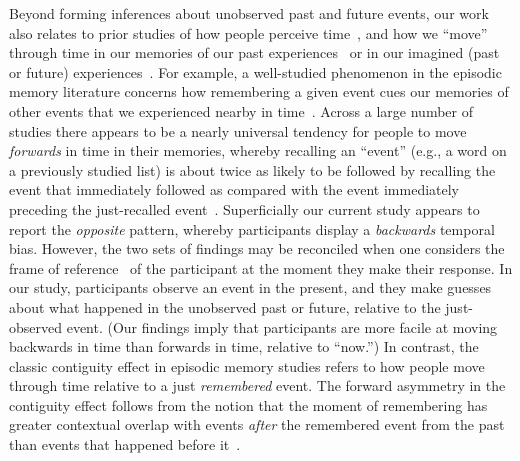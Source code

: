 \documentclass[10pt]{article}
\begin{document}
Beyond forming inferences about unobserved past and future events, our work
also relates to prior studies of how people perceive time~\citep{BlocGrub14,
Howa18, Eagl08, IvrySchl08, Wear16}, and how we ``move'' through time in our
memories of our past experiences~\citep{Mann21a, MannEtal11, HowaEtal12,
MannEtal07, ShanHowa12, Kaha96, PolyKaha08, SchaTulv94} or in our imagined
(past or future) experiences~\citep{Scha12, JossTone20, SchaEtal98,
MomeHowa18}. For example, a well-studied phenomenon in the episodic memory
literature concerns how remembering a given event cues our memories of other
events that we experienced nearby in time~\citep[i.e., the \textit{contiguity
effect};][]{Kaha96}. Across a large number of studies there appears to be a
nearly universal tendency for people to move \textit{forwards} in time in their
memories, whereby recalling an ``event'' (e.g., a word on a previously studied
list) is about twice as likely to be followed by recalling the event that
immediately followed as compared with the event immediately preceding the
just-recalled event~\citep{HealKaha14a}. Superficially our current study
appears to report the \textit{opposite} pattern, whereby participants display a
\textit{backwards} temporal bias. However, the two sets of findings may be
reconciled when one considers the frame of reference~\citep[and current mental
context; e.g.,][]{HowaKaha02a} of the participant at the moment they make their
response. In our study, participants observe an event in the present, and they
make guesses about what happened in the unobserved past or future, relative to
the just-observed event. (Our findings imply that participants are more facile
at moving backwards in time than forwards in time, relative to ``now.'') In
contrast, the classic contiguity effect in episodic memory studies refers to
how people move through time relative to a just \textit{remembered} event. The
forward asymmetry in the contiguity effect follows from the notion that the
moment of remembering has greater contextual overlap with events \textit{after}
the remembered event from the past than events that happened before
it~\citep[for review also see ][]{MannEtal15, Mann20}.
\end{document}

